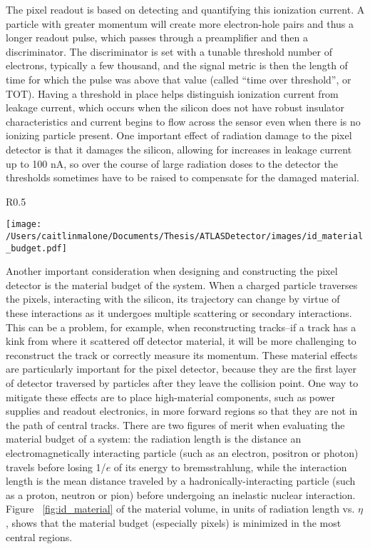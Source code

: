 The pixel readout is based on detecting and quantifying this ionization current.  A particle with greater momentum will create more electron-hole pairs and thus a longer readout pulse, which passes through a preamplifier and then a discriminator.  The discriminator is set with a tunable threshold number of electrons, typically a few thousand, and the signal metric is then the length of time for which the pulse was above that value (called ``time over threshold'', or TOT).  Having a threshold in place helps distinguish ionization current from leakage current, which occurs when the silicon does not have robust insulator characteristics and current begins to flow across the sensor even when there is no ionizing particle present.  One important effect of radiation damage to the pixel detector is that it damages the silicon, allowing for increases in leakage current up to 100 nA, so over the course of large radiation doses to the detector the thresholds sometimes have to be raised to compensate for the damaged material.  


\begin{wrapfigure}{R}{0.5\textwidth}
  \begin{center}
	\texttt{[image: /Users/caitlinmalone/Documents/Thesis/ATLASDetector/images/id\_material\_budget.pdf]}
	\label{fig:id_material}
	\end{center}
\end{wrapfigure}

Another important consideration when designing and constructing the pixel detector is the material budget of the system.  When a charged particle traverses the pixels, interacting with the silicon, its trajectory can change by virtue of these interactions as it undergoes multiple scattering or secondary interactions.  This can be a problem, for example, when reconstructing tracks--if a track has a kink from where it scattered off detector material, it will be more challenging to reconstruct the track or correctly measure its momentum.  These material effects are particularly important for the pixel detector, because they are the first layer of detector traversed by particles after they leave the collision point.  One way to mitigate these effects are to place high-material components, such as power supplies and readout electronics, in more forward regions so that they are not in the path of central tracks.  There are two figures of merit when evaluating the material budget of a system: the radiation length is the distance an electromagnetically interacting particle (such as an electron, positron or photon) travels before losing 1/$e$ of its energy to bremsstrahlung, while the interaction length is the mean distance traveled by a hadronically-interacting particle (such as a proton, neutron or pion) before undergoing an inelastic nuclear interaction.  Figure ~\ref{fig:id_material} of the material volume, in units of radiation length vs. $\eta$, shows that the material budget (especially pixels) is minimized in the most central regions.


